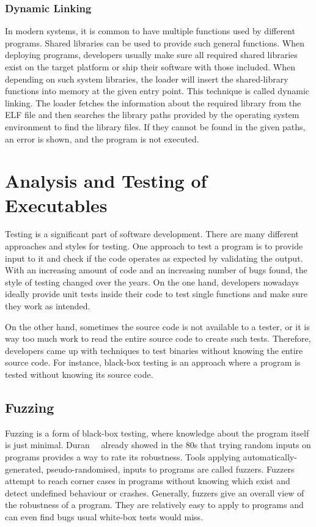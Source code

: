 \subsubsection{Dynamic Linking}

In modern systems, it is common to have multiple functions used by different
programs. Shared libraries can be used to provide such general functions. When
deploying programs, developers usually make sure all required shared libraries
exist on the target platform or ship their software with those included. When
depending on such system libraries, the loader will insert the shared-library
functions into memory at the given entry point. This technique is called dynamic
linking. The loader fetches the information about the required library from the
ELF file and then searches the library paths provided by the operating system
environment to find the library files. If they cannot be found in the given
paths, an error is shown, and the program is not executed.

\section{Analysis and Testing of Executables}

Testing is a significant part of software development. There are many different
approaches and styles for testing. One approach to test a program is to provide
input to it and check if the code operates as expected by validating the output.
With an increasing amount of code and an increasing number of bugs found, the
style of testing changed over the years. On the one hand, developers nowadays
ideally provide unit tests inside their code to test single functions and make
sure they work as intended.

On the other hand, sometimes the source code is not available to a tester, or it
is way too much work to read the entire source code to create such tests.
Therefore, developers came up with techniques to test binaries without knowing
the entire source code. For instance, black-box testing is an approach where a
program is tested without knowing its source code.

\subsection{Fuzzing}

Fuzzing is a form of black-box testing, where knowledge about the program itself
is just minimal. Duran~\etal~\cite{randtest} already showed in the 80s that
trying random inputs on programs provides a way to rate its robustness. Tools
applying automatically-generated, pseudo-randomised, inputs to programs are
called fuzzers. Fuzzers attempt to reach corner cases in programs without
knowing which exist and detect undefined behaviour or crashes. Generally,
fuzzers give an overall view of the robustness of a program. They are relatively
easy to apply to programs and can even find bugs usual white-box tests would
miss.

